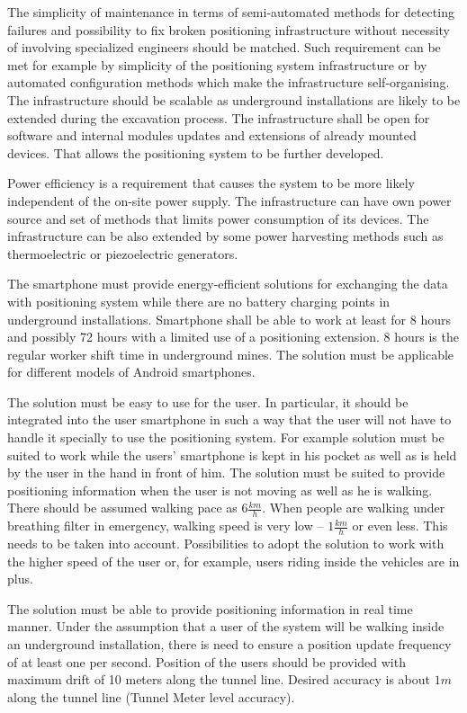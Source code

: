\documentclass[../main.tex]{subfiles}
\begin{document}
The simplicity of maintenance in terms of semi-automated methods for detecting failures and possibility to fix broken positioning infrastructure without necessity of involving specialized engineers should be matched. Such requirement can be met for example by simplicity of the positioning system infrastructure or by automated configuration methods which make the infrastructure self-organising. The infrastructure should be scalable as underground installations are likely to be extended during the excavation process. The infrastructure shall be open for software and internal modules updates and extensions of already mounted devices. That allows the positioning system to be further developed.

Power efficiency is a requirement that causes the system to be more likely independent of the on-site power supply. The infrastructure can have own power source and set of methods that limits power consumption of its devices. The infrastructure can be also extended by some power harvesting methods such as thermoelectric or piezoelectric generators.

The smartphone must provide energy-efficient solutions for exchanging the data with positioning system while there are no battery charging points in underground installations. Smartphone shall be able to work at least for 8 hours and possibly 72 hours with a limited use of a positioning extension. 8 hours is the regular worker shift time in underground mines. The solution must be applicable for different models of Android smartphones.

The solution must be easy to use for the user. In particular, it should be integrated into the user smartphone in such a way that the user will not have to handle it specially to use the positioning system. For example solution must be suited to work while the users' smartphone is kept in his pocket as well as is held by the user in the hand in front of him. The solution must be suited to provide positioning information when the user is not moving as well as he is walking. There should be assumed walking pace as $6 \frac{km}{h}$. When people are walking under breathing filter in emergency, walking speed is very low -- $1 \frac{km}{h}$ or even less\cite{Thesis_CM}. This needs to be taken into account. Possibilities to adopt the solution to work with the higher speed of the user or, for example, users riding inside the vehicles are in plus.

The solution must be able to provide positioning information in real time manner. Under the assumption that a user of the system will be walking inside an underground installation, there is need to ensure a position update frequency of at least one per second. Position of the users should be provided with maximum drift of 10 meters along the tunnel line. Desired accuracy is about $1m$ along the tunnel line (Tunnel Meter level accuracy).
\end{document}
